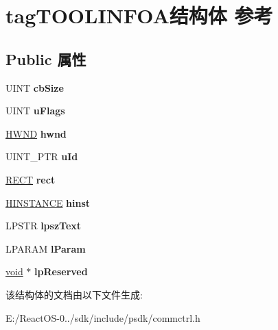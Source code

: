 \hypertarget{structtag_t_o_o_l_i_n_f_o_a}{}\section{tag\+T\+O\+O\+L\+I\+N\+F\+O\+A结构体 参考}
\label{structtag_t_o_o_l_i_n_f_o_a}
\subsection*{Public 属性}
\begin{DoxyCompactItemize}
\item 
\mbox{\label{structtag_t_o_o_l_i_n_f_o_a_a98b1d96bef9906649ec19a19e5d9dbff}} 
U\+I\+NT {\bfseries cb\+Size}
\item 
\mbox{\label{structtag_t_o_o_l_i_n_f_o_a_a8af77feccf8650351c46f92040145e71}} 
U\+I\+NT {\bfseries u\+Flags}
\item 
\mbox{\label{structtag_t_o_o_l_i_n_f_o_a_a41cdede7237321b86672ab0f288cabaa}} 
\hyperlink{interfacevoid}{H\+W\+ND} {\bfseries hwnd}
\item 
\mbox{\label{structtag_t_o_o_l_i_n_f_o_a_ad135f2a850e644079a945c16239d9a24}} 
U\+I\+N\+T\+\_\+\+P\+TR {\bfseries u\+Id}
\item 
\mbox{\label{structtag_t_o_o_l_i_n_f_o_a_a139d4e2f77e636717193c9be96e6db0a}} 
\hyperlink{structtag_r_e_c_t}{R\+E\+CT} {\bfseries rect}
\item 
\mbox{\label{structtag_t_o_o_l_i_n_f_o_a_a14de57757c3f0f45b23ed8e1ccc33eb8}} 
\hyperlink{interfacevoid}{H\+I\+N\+S\+T\+A\+N\+CE} {\bfseries hinst}
\item 
\mbox{\label{structtag_t_o_o_l_i_n_f_o_a_ac7a1907310571f8a124adf6263a357db}} 
L\+P\+S\+TR {\bfseries lpsz\+Text}
\item 
\mbox{\label{structtag_t_o_o_l_i_n_f_o_a_a04264fa9733121a6395d46b0927aece9}} 
L\+P\+A\+R\+AM {\bfseries l\+Param}
\item 
\mbox{\label{structtag_t_o_o_l_i_n_f_o_a_a046ec4ebe46ed9b66117bfd782a5359d}} 
\hyperlink{interfacevoid}{void} $\ast$ {\bfseries lp\+Reserved}
\end{DoxyCompactItemize}


该结构体的文档由以下文件生成\+:\begin{DoxyCompactItemize}
\item 
E\+:/\+React\+O\+S-\/0../sdk/include/psdk/commctrl.\+h\end{DoxyCompactItemize}
